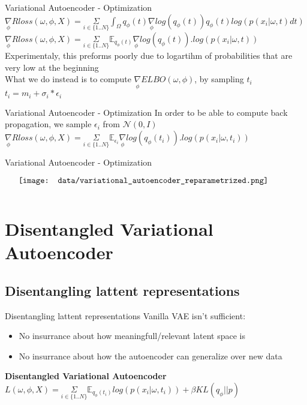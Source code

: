 \documentclass{beamer}
\begin{document}
\begin{frame}{Variational Autoencoder - Optimization}
        $\underset{\phi}{\nabla} Rloss(\omega, \phi, X) =\underset{i \in \{1..N\}}{\Sigma} \int_\Omega q_\phi(t)\underset{\phi}{\nabla}log(q_\phi(t)) q_\phi(t) log( p(x_i | \omega, t) dt)$ \\
	$\underset{\phi}{\nabla} Rloss(\omega, \phi, X) = \underset{i \in \{1..N\}}{\Sigma} \mathbb{E}_{q_\phi(t)} \underset{\phi}{\nabla} log(q_\phi(t)) .log( p(x_i | \omega, t)) $  
	Experimentaly, this preforms poorly due to logartihm of probabilities that are very low at the beginning\\
	What we do instead is to compute $\underset{\phi}{\nabla} ELBO(\omega,\phi)$, by sampling $t_i$ \\
	$t_i = m_i + \sigma_i * \epsilon_i$ \\
\end{frame}

\begin{frame}{Variational Autoencoder - Optimization}
	In order to be able to compute back propagation, we sample $\epsilon_i$ from  $\mathcal{N}(0,I)$
	$\underset{\phi}{\nabla} Rloss(\omega, \phi, X) = \underset{i \in \{1..N\}}{\Sigma} \mathbb{E}_{\epsilon_{i}} \underset{\phi}{\nabla} log(q_\phi(t_i)) .log( p(x_i | \omega, t_i)) $  
\end{frame}

\begin{frame}{Variational Autoencoder - Optimization}
    \begin{minipage}{5in}
    \centering
    $\vcenter{
    \texttt{[image: data/variational\_autoencoder\_reparametrized.png]} \\
    }$
    \end{minipage}
\end{frame}

\section{Disentangled Variational Autoencoder}
\subsection{Disentangling lattent representations}
\begin{frame}{Disentangling lattent representations}
	Vanilla VAE isn't sufficient:
	\begin{itemize}
		\item No insurrance about how meaningfull/relevant latent space is 
		\item No insurrance about how the autoencoder can generalize over new data 
	\end{itemize}
    \bf{Disentangled Variational Autoencoder}
	$ L(\omega, \phi, X)= \underset{i \in \{1..N\}}{\Sigma} \mathbb{E}_{q_\phi(t_i)} log( p(x_i | \omega, t_i)) + \beta KL( q_\phi || p ) $
\end{frame}
\end{document}
